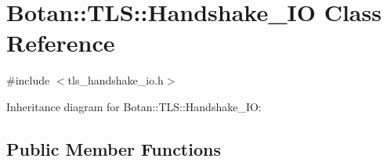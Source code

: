\hypertarget{class_botan_1_1_t_l_s_1_1_handshake___i_o}{}\section{Botan\+:\+:T\+LS\+:\+:Handshake\+\_\+\+IO Class Reference}
\label{class_botan_1_1_t_l_s_1_1_handshake___i_o}


{\ttfamily \#include $<$tls\+\_\+handshake\+\_\+io.\+h$>$}



Inheritance diagram for Botan\+:\+:T\+LS\+:\+:Handshake\+\_\+\+IO\+:
\subsection*{Public Member Functions}
